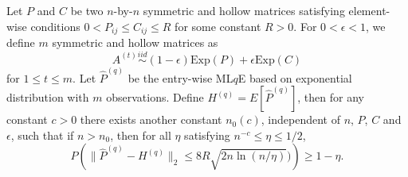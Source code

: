 \begin{theorem}
\label{thm:PqDiff}
Let $P$ and $C$ be two $n$-by-$n$ symmetric and hollow matrices satisfying element-wise conditions $0 < P_{ij} \le C_{ij} \le R$ for some constant $R > 0$. For $0 < \epsilon < 1$, we define $m$ symmetric and hollow matrices as
\[
	A^{(t)} \stackrel{iid}{\sim} (1-\epsilon) \mathrm{Exp}(P) + \epsilon \mathrm{Exp}(C)
\]
for $1 \le t \le m$.
Let $\hat{P}^{(q)}$ be the entry-wise ML$q$E based on exponential distribution with $m$ observations.
Define $H^{(q)} = E[\hat{P}^{(q)}]$,
then for any constant $c > 0$ there exists another constant $n_0(c)$, independent of $n$, $P$, $C$ and $\epsilon$, such that if $n > n_0$, then for all $\eta$ satisfying $n^{-c} \le \eta \le 1/2$,
\[
	P \left( \| \hat{P}^{(q)} - H^{(q)} \|_2 \le 8 R \sqrt{2 n \ln(n/\eta)}) \right) \ge 1 - \eta.
\]
\end{theorem}
